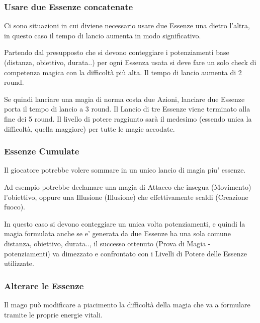 \documentclass[a4paper,11pt,twoside,openany]{book}
\begin{document}
\subsubsection{Usare due Essenze concatenate}

Ci sono situazioni in cui diviene necessario usare due Essenze una dietro l'altra, in questo caso il tempo di lancio aumenta in modo significativo.

Partendo dal presupposto che si devono conteggiare i potenziamenti base (distanza, obiettivo, durata..) per ogni Essenza usata si deve fare un solo check di competenza magica con la difficoltà più alta. Il tempo di lancio aumenta di 2 round.

Se quindi lanciare una magia di norma costa due Azioni, lanciare due Essenze porta il tempo di lancio a 3 round. Il Lancio di tre Essenze viene terminato alla fine dei 5 round. Il livello di potere raggiunto sarà il medesimo (essendo unica la difficoltà, quella maggiore) per tutte le magie accodate.

\subsubsection{Essenze Cumulate}

Il giocatore potrebbe volere sommare in un unico lancio di magia piu' essenze.

Ad esempio potrebbe declamare una magia di Attacco che insegua (Movimento) l'obiettivo, oppure una Illusione (Illusione) che effettivamente scaldi (Creazione fuoco).


In questo caso si devono conteggiare un unica volta potenziamenti, e quindi la magia formulata anche se e' generata da due Essenze ha una sola comune distanza, obiettivo, durata.., il successo ottenuto (Prova di Magia - potenziamenti) va dimezzato e confrontato con i Livelli di Potere delle Essenze utilizzate.


\subsubsection{Alterare le Essenze}

\label{alterare-le-essenze}

Il mago può modificare a piacimento la difficoltà della magia che va a formulare tramite le proprie energie vitali.
\end{document}
